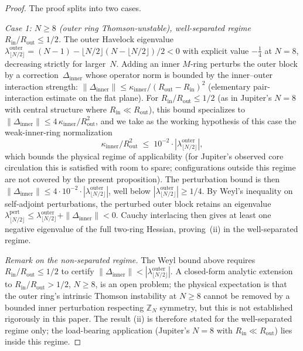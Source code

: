 \begin{proof}
The proof splits into two cases.

\emph{Case 1: $N \ge 8$ (outer ring Thomson-unstable),
well-separated regime $R_{\mathrm{in}}/R_{\mathrm{out}} \le 1/2$.}
The outer Havelock eigenvalue
$\lambda_{\lfloor N/2\rfloor}^{\mathrm{outer}}
= (N{-}1) - \lfloor N/2\rfloor(N{-}\lfloor N/2\rfloor)/2 < 0$
with explicit value $-\tfrac{1}{4}$ at $N = 8$, decreasing
strictly for larger~$N$.
Adding an inner $M$-ring perturbs the outer block by a
correction~$\Delta_{\mathrm{inner}}$ whose operator norm
is bounded by the inner--outer interaction strength:
$\|\Delta_{\mathrm{inner}}\|
\le \kappa_{\mathrm{inner}}/(R_{\mathrm{out}} - R_{\mathrm{in}})^2$
(elementary pair-interaction estimate on the flat plane).
For $R_{\mathrm{in}}/R_{\mathrm{out}} \le 1/2$
(as in Jupiter's $N = 8$ with central structure where
$R_{\mathrm{in}} \ll R_{\mathrm{out}}$), this bound
specializes to $\|\Delta_{\mathrm{inner}}\|
\le 4\,\kappa_{\mathrm{inner}}/R_{\mathrm{out}}^2$,
and we take as the working hypothesis of this case
the weak-inner-ring normalization
\begin{equation}\label{eq:weak-inner-hypothesis}
  \kappa_{\mathrm{inner}} / R_{\mathrm{out}}^2
  \;\le\; 10^{-2} \cdot
  |\lambda_{\lfloor N/2\rfloor}^{\mathrm{outer}}|,
\end{equation}
which bounds the physical regime of applicability
(for Jupiter's observed core circulation this is
satisfied with room to spare; configurations outside
this regime are not covered by the present proposition).
The perturbation bound is then
$\|\Delta_{\mathrm{inner}}\|
\le 4 \cdot 10^{-2} \cdot
|\lambda_{\lfloor N/2\rfloor}^{\mathrm{outer}}|$,
well below $|\lambda_{\lfloor N/2\rfloor}^{\mathrm{outer}}|
\ge 1/4$.
By Weyl's inequality on self-adjoint perturbations,
the perturbed outer block retains an eigenvalue
$\lambda^{\mathrm{pert}}_{\lfloor N/2\rfloor}
\le \lambda_{\lfloor N/2\rfloor}^{\mathrm{outer}}
+ \|\Delta_{\mathrm{inner}}\| < 0$.
Cauchy interlacing then gives at least one negative
eigenvalue of the full two-ring Hessian, proving~(ii)
in the well-separated regime.

\emph{Remark on the non-separated regime.}
The Weyl bound above requires
$R_{\mathrm{in}}/R_{\mathrm{out}} \le 1/2$
to certify $\|\Delta_{\mathrm{inner}}\| <
|\lambda_{\lfloor N/2\rfloor}^{\mathrm{outer}}|$.
A closed-form analytic extension to
$R_{\mathrm{in}}/R_{\mathrm{out}} > 1/2$, $N \ge 8$,
is an open problem; the physical expectation is that
the outer ring's intrinsic Thomson instability at
$N \ge 8$ cannot be removed by a bounded inner
perturbation respecting $\mathbb{Z}_N$ symmetry, but
this is not established rigorously in this paper.
The result (ii) is therefore stated for the
well-separated regime only; the load-bearing
application (Jupiter's $N = 8$ with $R_{\mathrm{in}}
\ll R_{\mathrm{out}}$) lies inside this regime.


\end{proof}
